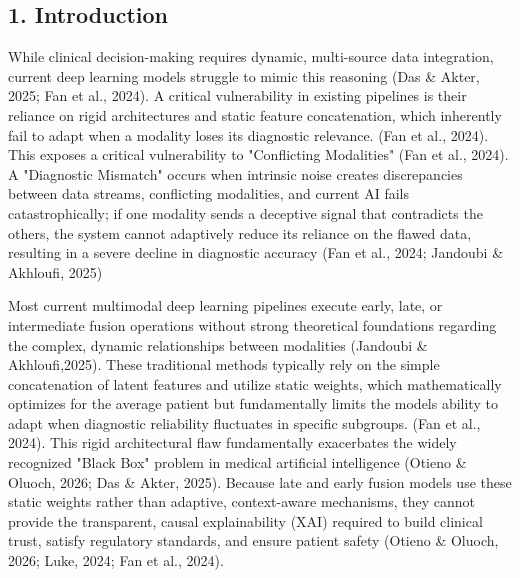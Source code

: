 \documentclass[
]{article}
\begin{document}
\subsection{\texorpdfstring{\textbf{1.
Introduction}}{1. Introduction}}\label{introduction}

While clinical decision-making requires dynamic, multi-source data
integration, current deep learning models struggle to mimic this
reasoning (Das \& Akter, 2025; Fan et al., 2024). A critical
vulnerability in existing pipelines is their reliance on rigid
architectures and static feature concatenation, which inherently fail to
adapt when a modality loses its diagnostic relevance. (Fan et al.,
2024). This exposes a critical vulnerability to "Conflicting Modalities"
(Fan et al., 2024). A "Diagnostic Mismatch" occurs when intrinsic noise
creates discrepancies between data streams, conflicting modalities, and
current AI fails catastrophically; if one modality sends a deceptive
signal that contradicts the others, the system cannot adaptively reduce
its reliance on the flawed data, resulting in a severe decline in
diagnostic accuracy (Fan et al., 2024; Jandoubi \& Akhloufi, 2025)

Most current multimodal deep learning pipelines execute early, late, or
intermediate fusion operations without strong theoretical foundations
regarding the complex, dynamic relationships between modalities
(Jandoubi \& Akhloufi,2025). These traditional methods typically rely on
the simple concatenation of latent features and utilize static weights,
which mathematically optimizes for the average patient but fundamentally
limits the model\textquotesingle s ability to adapt when diagnostic
reliability fluctuates in specific subgroups. (Fan et al., 2024). This
rigid architectural flaw fundamentally exacerbates the widely recognized
"Black Box" problem in medical artificial intelligence (Otieno \&
Oluoch, 2026; Das \& Akter, 2025). Because late and early fusion models
use these static weights rather than adaptive, context-aware mechanisms,
they cannot provide the transparent, causal explainability (XAI)
required to build clinical trust, satisfy regulatory standards, and
ensure patient safety (Otieno \& Oluoch, 2026; Luke, 2024; Fan et al.,
2024).
\end{document}
